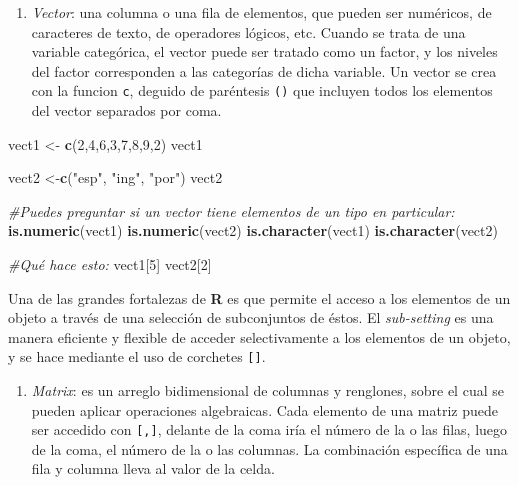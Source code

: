 \documentclass[
]{article}
\newenvironment{Shaded}{\begin{snugshade}}{\end{snugshade}}
\newcommand{\CommentTok}[1]{\textcolor[rgb]{0.56,0.35,0.01}{\textit{#1}}}
\newcommand{\DecValTok}[1]{\textcolor[rgb]{0.00,0.00,0.81}{#1}}
\newcommand{\KeywordTok}[1]{\textcolor[rgb]{0.13,0.29,0.53}{\textbf{#1}}}
\newcommand{\NormalTok}[1]{#1}
\newcommand{\StringTok}[1]{\textcolor[rgb]{0.31,0.60,0.02}{#1}}
\providecommand{\tightlist}{%
  \setlength{\itemsep}{0pt}\setlength{\parskip}{0pt}}
\begin{document}
\begin{enumerate}
\def\labelenumi{\Alph{enumi})}
\tightlist
\item
  \emph{Vector}: una columna o una fila de elementos, que pueden ser
  numéricos, de caracteres de texto, de operadores lógicos, etc. Cuando
  se trata de una variable categórica, el vector puede ser tratado como
  un factor, y los niveles del factor corresponden a las categorías de
  dicha variable. Un vector se crea con la funcion \texttt{c}, deguido
  de paréntesis \texttt{()} que incluyen todos los elementos del vector
  separados por coma.
\end{enumerate}

\begin{Shaded}
\begin{Highlighting}[]
\NormalTok{vect1 <-}\StringTok{ }\KeywordTok{c}\NormalTok{(}\DecValTok{2}\NormalTok{,}\DecValTok{4}\NormalTok{,}\DecValTok{6}\NormalTok{,}\DecValTok{3}\NormalTok{,}\DecValTok{7}\NormalTok{,}\DecValTok{8}\NormalTok{,}\DecValTok{9}\NormalTok{,}\DecValTok{2}\NormalTok{)}
\NormalTok{vect1}

\NormalTok{vect2 <-}\KeywordTok{c}\NormalTok{(}\StringTok{"esp"}\NormalTok{, }\StringTok{"ing"}\NormalTok{, }\StringTok{"por"}\NormalTok{)}
\NormalTok{vect2}

\CommentTok{#Puedes preguntar si un vector tiene elementos de un tipo en particular:}
\KeywordTok{is.numeric}\NormalTok{(vect1)}
\KeywordTok{is.numeric}\NormalTok{(vect2)}
\KeywordTok{is.character}\NormalTok{(vect1)}
\KeywordTok{is.character}\NormalTok{(vect2)}

\CommentTok{#Qué hace esto:}
\NormalTok{vect1[}\DecValTok{5}\NormalTok{]}
\NormalTok{vect2[}\DecValTok{2}\NormalTok{]}
\end{Highlighting}
\end{Shaded}

Una de las grandes fortalezas de \textbf{R} es que permite el acceso a
los elementos de un objeto a través de una selección de subconjuntos de
éstos. El \emph{sub-setting} es una manera eficiente y flexible de
acceder selectivamente a los elementos de un objeto, y se hace mediante
el uso de corchetes \texttt{{[}{]}}.

\begin{enumerate}
\def\labelenumi{\Alph{enumi})}
\setcounter{enumi}{1}
\tightlist
\item
  \emph{Matrix}: es un arreglo bidimensional de columnas y renglones,
  sobre el cual se pueden aplicar operaciones algebraicas. Cada elemento
  de una matriz puede ser accedido con \texttt{{[},{]}}, delante de la
  coma iría el número de la o las filas, luego de la coma, el número de
  la o las columnas. La combinación específica de una fila y columna
  lleva al valor de la celda.
\end{enumerate}
\end{document}
